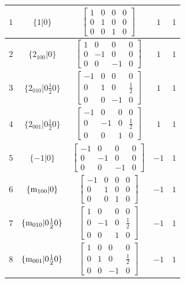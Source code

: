 \documentclass[fleqn,8pt]{jsarticle}
\begin{document}
\begin{longtable}{ccccc}
$ 1 $ & $ \{1|0\} $ & $ \begin{bmatrix} 1 & 0 & 0 & 0 \\ 0 & 1 & 0 & 0 \\ 0 & 0 & 1 & 0 \end{bmatrix} $ & $ 1 $ & $ 1 $ \\ \hline
$ 2 $ & $ \{2{}_{100}|0\} $ & $ \begin{bmatrix} 1 & 0 & 0 & 0 \\ 0 & -1 & 0 & 0 \\ 0 & 0 & -1 & 0 \end{bmatrix} $ & $ 1 $ & $ 1 $ \\ \hline
$ 3 $ & $ \{2{}_{010}|0 \frac{1}{2} 0\} $ & $ \begin{bmatrix} -1 & 0 & 0 & 0 \\ 0 & 1 & 0 & \frac{1}{2} \\ 0 & 0 & -1 & 0 \end{bmatrix} $ & $ 1 $ & $ 1 $ \\ \hline
$ 4 $ & $ \{2{}_{001}|0 \frac{1}{2} 0\} $ & $ \begin{bmatrix} -1 & 0 & 0 & 0 \\ 0 & -1 & 0 & \frac{1}{2} \\ 0 & 0 & 1 & 0 \end{bmatrix} $ & $ 1 $ & $ 1 $ \\ \hline
$ 5 $ & $ \{-1|0\} $ & $ \begin{bmatrix} -1 & 0 & 0 & 0 \\ 0 & -1 & 0 & 0 \\ 0 & 0 & -1 & 0 \end{bmatrix} $ & $ -1 $ & $ 1 $ \\ \hline
$ 6 $ & $ \{{\rm m}_{100}|0\} $ & $ \begin{bmatrix} -1 & 0 & 0 & 0 \\ 0 & 1 & 0 & 0 \\ 0 & 0 & 1 & 0 \end{bmatrix} $ & $ -1 $ & $ 1 $ \\ \hline
$ 7 $ & $ \{{\rm m}_{010}|0 \frac{1}{2} 0\} $ & $ \begin{bmatrix} 1 & 0 & 0 & 0 \\ 0 & -1 & 0 & \frac{1}{2} \\ 0 & 0 & 1 & 0 \end{bmatrix} $ & $ -1 $ & $ 1 $ \\ \hline
$ 8 $ & $ \{{\rm m}_{001}|0 \frac{1}{2} 0\} $ & $ \begin{bmatrix} 1 & 0 & 0 & 0 \\ 0 & 1 & 0 & \frac{1}{2} \\ 0 & 0 & -1 & 0 \end{bmatrix} $ & $ -1 $ & $ 1 $ \\ \hline

\end{longtable}
\end{document}
